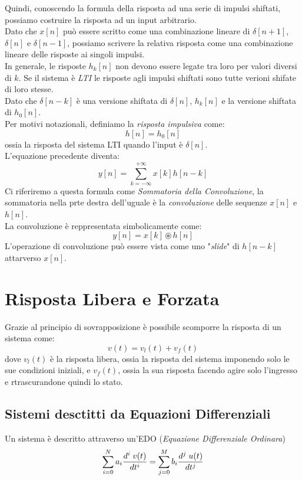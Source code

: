 \documentclass{article}
\begin{document}
				Quindi, conoscendo la formula della risposta ad una serie di impulsi shiftati, possiamo costruire la risposta ad un input arbitrario. \\
				Dato che $ x[n] $ può essere scritto come una combinazione lineare di $ \delta[n+1] $, $ \delta[n] $ e $ \delta[n-1] $, possiamo scrivere la relativa risposta come una combinazione lineare delle risposte ai singoli impulsi. \\
				In generale, le risposte $ h_{k}[n] $ non devono essere legate tra loro per valori diversi di $ k $. Se il sistema è \textit{LTI} le risposte agli impulsi shiftati sono tutte verioni shifate di loro stesse. \\
				Dato che $ \delta[n-k] $ è una versione shiftata di $ \delta[n] $, $ h_{k}[n] $ e la versione shiftata di $ h_0[n] $. \\
				Per motivi notazionali, definiamo la \textit{risposta impulsiva} come:
				\[
					h[n] = h_0[n]
				\]
				ossia la risposta del sistema LTI quando l'input è $ \delta[n] $. \\
				L'equazione precedente diventa:
				\[
					y[n] = \sum_{k=-\infty}^{+\infty} {x[k] h[n-k]}
				\]
				Ci riferiremo a questa formula come \textit{Sommatoria della Convoluzione}, la sommatoria nella prte destra dell'uguale è la \textit{convoluzione} delle sequenze $ x[n] $ e $ h[n] $. \\
				La convoluzione è reppresentata simbolicamente come:
				\[
					y[n] = x[k] \circledast h[n]
				\]
				L'operazione di convoluzione può essere vista come uno "\textit{slide}" di $ h[n-k] $ attarverso $ x[n] $.

	\section{Risposta Libera e Forzata}
		Grazie al principio di sovrapposizione è possibile scomporre la risposta di un sistema come:
		\[
			v(t)=v_l(t) + v_f(t)
		\]
		dove $ v_l(t) $ è la risposta libera, ossia la risposta del sistema imponendo solo le sue condizioni iniziali, e $ v_f(t) $, ossia la sua risposta facendo agire solo l'ingresso e rtrascurandone quindi lo stato.

		\subsection{Sistemi desctitti da Equazioni Differenziali}
			Un sistema è descritto attraverso un'EDO (\textit{Equazione Differenziale Ordinara})
			\[
				\sum_{i=0}^{N} {a_i{{d^i\; v(t)}\over{dt^i}}} = \sum_{j=0}^{M} {b_i{{d^j\; u(t)}\over{dt^j}}}
			\]
\end{document}
